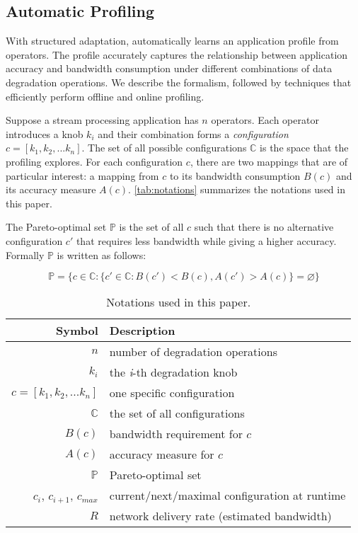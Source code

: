 \subsection{Automatic Profiling}
\label{sec:automatic-profiling}

With structured adaptation, \sysname{} automatically learns an application
profile from \maybe{} operators. The profile accurately captures the
relationship between application accuracy and bandwidth consumption under
different combinations of data degradation operations. We describe the
formalism, followed by techniques that efficiently perform offline and online
profiling.

 Suppose a stream processing application has $n$
\maybe{} operators. Each operator introduces a knob $k_i$ and their combination
forms a \textit{configuration} $c = [k_{1}, k_{2}, ... k_{n}]$. The set of all
possible configurations $\mathbb{C}$ is the space that the profiling
explores. For each configuration $c$, there are two mappings that are of
particular interest: a mapping from $c$ to its bandwidth consumption $B(c)$ and
its accuracy measure $A(c)$. \autoref{tab:notations} summarizes the notations
used in this paper.

The Pareto-optimal set $\mathbb{P}$ is the set of all $c$ such that there is no
alternative configuration $c'$ that requires less bandwidth while giving a
higher accuracy. Formally $\mathbb{P}$ is written as follows:

{\small \vspace{-1em}
  \begin{equation}
  \mathbb{P} = \{ c \in \mathbb{C} : \{ c' \in \mathbb{C}: B(c') < B(c),
  A(c') > A(c) \} = \varnothing\}
  \label{eq:pareto}
\end{equation}
}%

\begin{table}
  \footnotesize
  \centering
  \begin{tabular}{r l}
    \toprule
    \textbf{Symbol} & \textbf{Description} \\
    \midrule
    $n$ & number of degradation operations \\
    $k_i$ & the \textit{i}-th degradation knob \\
    $c = [k_{1}, k_{2}, ... k_{n}]$ & one specific configuration \\
    $\mathbb{C}$ & the set of all configurations \\
    \midrule
    $B(c)$ & bandwidth requirement for $c$ \\
    $A(c)$ & accuracy measure for $c$ \\
    $\mathbb{P}$ & Pareto-optimal set \\
    \midrule
    $c_i$, $c_{i+1}$, $c_{max}$ & current/next/maximal configuration at runtime \\
    $R$ & network delivery rate (estimated bandwidth) \\
    \bottomrule
  \end{tabular}
  \caption{Notations used in this paper.}
  \label{tab:notations}
\end{table}

